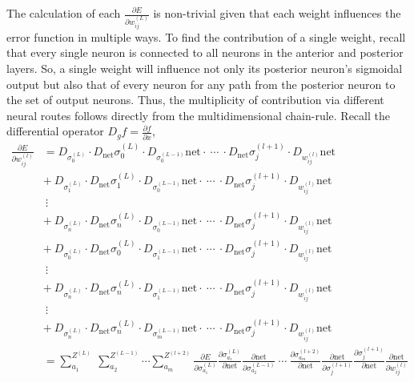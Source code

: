 The calculation of each \(\frac{\partial E}{\partial w_{ij}^{(L)}}\) is non-trivial given that each weight influences the error function in multiple ways.  To find the contribution of a single weight, recall that every single neuron is connected to all neurons in the anterior and posterior layers. So, a single weight will influence not only its posterior neuron’s sigmoidal output but also that of every neuron for any path from the posterior neuron to the set of output neurons. Thus, the multiplicity of contribution via different neural routes follows directly from the multidimensional chain-rule. Recall the differential operator \(D_g f=\frac{\partial f}{\partial x}\),
\begin{equation}
	\begin{aligned}
    \frac{\partial E}{\partial w_{ij}^{(l)}} &= D_{\sigma_0^{(L)}}\cdot D_{\mathrm{net}} \sigma_0^{(L)} \cdot D_{\sigma_0^{(L-1)}}\mathrm{net}\cdot \  \cdots \  \cdot  D_{\mathrm{net}} \sigma_j^{(l+1)} \cdot D_{w_{ij}^{(l)}}\mathrm{net} \\
    &+\  D_{\sigma_1^{(L)}}\cdot D_{\mathrm{net}} \sigma_1^{(L)} \cdot D_{\sigma_0^{(L-1)}}\mathrm{net}\cdot\  \cdots \  \cdot  D_{\mathrm{net}} \sigma_j^{(l+1)} \cdot D_{w_{ij}^{(l)}}\mathrm{net} \\
    &\ \vdots\\
    &+\  D_{\sigma_n^{(L)}}\cdot D_{\mathrm{net}} \sigma_n^{(L)} \cdot D_{\sigma_0^{(L-1)}}\mathrm{net}\cdot \  \cdots \  \cdot  D_{\mathrm{net}} \sigma_j^{(l+1)} \cdot D_{w_{ij}^{(l)}}\mathrm{net} \\
        &+\  D_{\sigma_0^{(L)}}\cdot D_{\mathrm{net}} \sigma_0^{(L)} \cdot D_{\sigma_1^{(L-1)}}\mathrm{net}\cdot \  \cdots \  \cdot  D_{\mathrm{net}} \sigma_j^{(l+1)} \cdot D_{w_{ij}^{(l)}}\mathrm{net} \\
            &\ \vdots\\
        &+\  D_{\sigma_n^{(L)}}\cdot D_{\mathrm{net}} \sigma_n^{(L)} \cdot D_{\sigma_1^{(L-1)}}\mathrm{net}\cdot \ \cdots \  \cdot  D_{\mathrm{net}} \sigma_j^{(l+1)} \cdot D_{w_{ij}^{(l)}}\mathrm{net} \\
                &\ \vdots \\
                        &+\  D_{\sigma_n^{(L)}}\cdot D_{\mathrm{net}} \sigma_n^{(L)} \cdot D_{\sigma_m^{(L-1)}}\mathrm{net}\cdot \ \cdots \ \cdot  D_{\mathrm{net}} \sigma_j^{(l+1)} \cdot D_{w_{ij}^{(l)}}\mathrm{net} \\
                        &= \sum_{a_1}^{Z^{(L)}}\ \sum_{a_2}^{Z^{(L-1)}} \cdots \sum_{a_m}^{Z^{(l+2)}} \frac{\partial E}{\partial \sigma_{a_1}^{(L)}}\frac{\partial \sigma_{a_1}^{(L)}}{\partial \mathrm{net}} \frac{\partial \mathrm{net}}{\partial \sigma_{a_2}^{(L-1)}} \ \cdots\ \frac{\partial \sigma_{a_m}^{(l+2)}}{\partial \mathrm{net}}\frac{\partial \mathrm{net}}{\partial \sigma_{j}^{(l+1)}}  \frac{\partial \sigma_{j}^{(l+1)}}{\partial \mathrm{net}} \frac{\partial \mathrm{net}}{\partial w_{ij}^{(l)}}

\end{aligned}
\end{equation}

